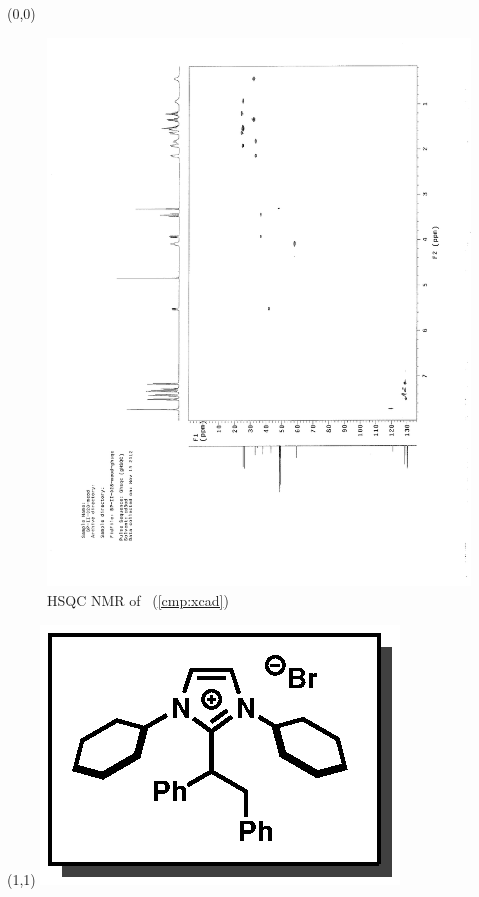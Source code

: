 \clearpage
\begin{textblock}{20}(0,0)
\begin{figure}[htb]
\caption{HSQC NMR of  \CMPxcad\ (\ref{cmp:xcad})}
\includegraphics[scale=0.75, trim = 0mm 0mm 0mm 5mm,
clip]{chp_alkylation/images/nmr/xcadHSQC}
\vspace{-100pt}
\end{figure}
\end{textblock}
\begin{textblock}{1}(1,1)
\includegraphics[scale=0.8, angle=90]{chp_alkylation/images/xcad}
\end{textblock}
\clearpage


